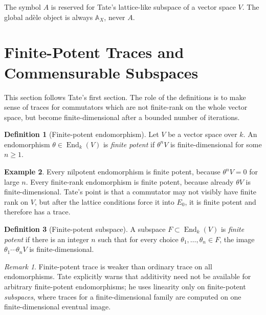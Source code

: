 \documentclass[11pt,a4paper]{article}
\newcommand{\AX}{\mathbb A_X}
\newcommand{\End}{\operatorname{End}}
\theoremstyle{definition}
\newtheorem{definition}{Definition}[section]
\newtheorem{example}[definition]{Example}
\theoremstyle{plain}
\theoremstyle{remark}
\newtheorem*{remark}{Remark}
\begin{document}
The symbol $A$ is reserved for Tate's lattice-like subspace of a vector space $V$.  The global adèle object is always $\AX$, never $A$.

\section{Finite-Potent Traces and Commensurable Subspaces}

This section follows Tate's first section.  The role of the definitions is to make sense of traces for commutators which are not finite-rank on the whole vector space, but become finite-dimensional after a bounded number of iterations.

\begin{definition}[Finite-potent endomorphism]
Let $V$ be a vector space over $k$.  An endomorphism $\theta\in\End_k(V)$ is \emph{finite potent} if $\theta^nV$ is finite-dimensional for some $n\ge 1$.
\end{definition}

\begin{example}
Every nilpotent endomorphism is finite potent, because $\theta^nV=0$ for large $n$.  Every finite-rank endomorphism is finite potent, because already $\theta V$ is finite-dimensional.  Tate's point is that a commutator may not visibly have finite rank on $V$, but after the lattice conditions force it into $E_0$, it is finite potent and therefore has a trace.
\end{example}

\begin{definition}[Finite-potent subspace]
A subspace $F\subset\End_k(V)$ is \emph{finite potent} if there is an integer $n$ such that for every choice $\theta_1,\ldots,\theta_n\in F$, the image $\theta_1\cdots\theta_nV$ is finite-dimensional.
\end{definition}

\begin{remark}
Finite-potent trace is weaker than ordinary trace on all endomorphisms.  Tate explicitly warns that additivity need not be available for arbitrary finite-potent endomorphisms; he uses linearity only on finite-potent \emph{subspaces}, where traces for a finite-dimensional family are computed on one finite-dimensional eventual image.
\end{remark}
\end{document}
